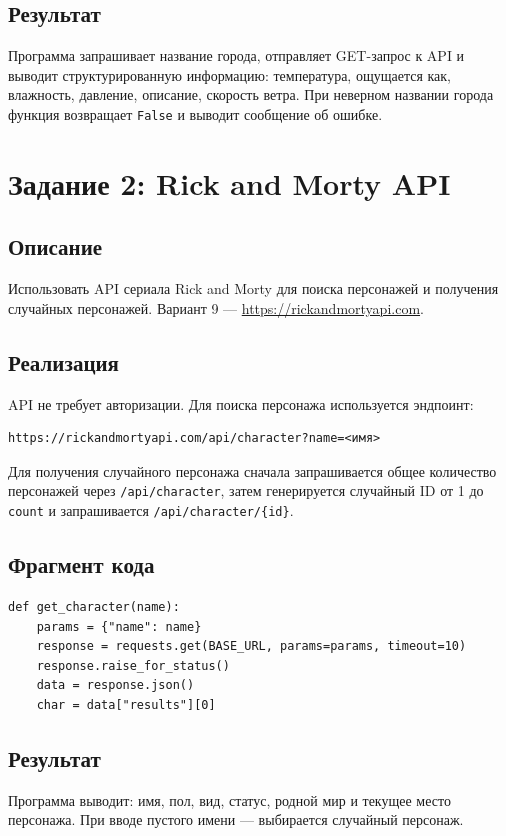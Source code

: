 \documentclass[12pt,a4paper]{article}
\begin{document}
\subsection*{Результат}
Программа запрашивает название города, отправляет GET-запрос к API и выводит структурированную информацию: температура, ощущается как, влажность, давление, описание, скорость ветра. При неверном названии города функция возвращает \texttt{False} и выводит сообщение об ошибке.

\section*{Задание 2: Rick and Morty API}
\subsection*{Описание}
Использовать API сериала Rick and Morty для поиска персонажей и получения случайных персонажей. Вариант 9 --- \url{https://rickandmortyapi.com}.

\subsection*{Реализация}
API не требует авторизации. Для поиска персонажа используется эндпоинт:
\begin{lstlisting}
https://rickandmortyapi.com/api/character?name=<имя>
\end{lstlisting}

Для получения случайного персонажа сначала запрашивается общее количество персонажей через \texttt{/api/character}, затем генерируется случайный ID от 1 до \texttt{count} и запрашивается \texttt{/api/character/\{id\}}.

\subsection*{Фрагмент кода}
\begin{lstlisting}
def get_character(name):
    params = {"name": name}
    response = requests.get(BASE_URL, params=params, timeout=10)
    response.raise_for_status()
    data = response.json()
    char = data["results"][0]
\end{lstlisting}

\subsection*{Результат}
Программа выводит: имя, пол, вид, статус, родной мир и текущее место персонажа. При вводе пустого имени --- выбирается случайный персонаж.
\end{document}

